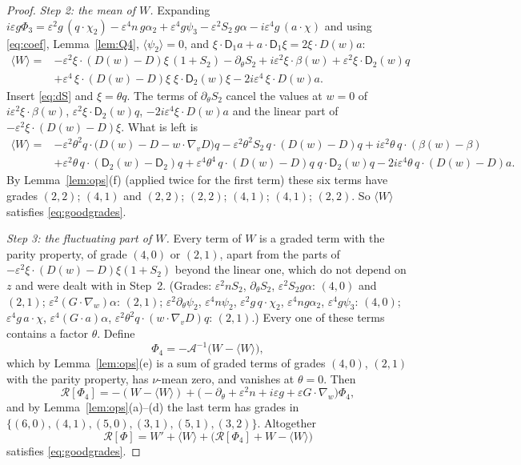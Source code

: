 \documentclass[11pt]{article}
\newcommand{\eps}{\varepsilon}
\newcommand{\cA}{\mathcal{A}}
\newcommand{\cR}{\mathcal{R}}
\newcommand{\sD}{\mathsf{D}}
\newcommand{\avg}[1]{\langle #1\rangle}
\theoremstyle{remark}
\begin{document}
\begin{proof}
\emph{Step 2: the mean of $W$.} Expanding
$i\eps g\Phi_3 = \eps^2g\,(q\cdot\chi_2) - \eps^4n\,g\alpha_2 + \eps^4g\psi_3
 - \eps^2S_2\,g\alpha - i\eps^4g\,(a\cdot\chi)$ and using \eqref{eq:coef},
Lemma~\ref{lem:Q4}, $\avg{\psi_2} = 0$, and
$\xi\cdot\sD_1a + a\cdot\sD_1\xi = 2\xi\cdot D(w)a$:
\begin{align*}
  \avg W ={}& -\eps^2\xi\cdot(D(w)-D)\xi\,(1+S_2) - \partial_\theta S_2
   + i\eps^2\xi\cdot\beta(w) + \eps^2\xi\cdot\sD_2(w)q\\
  & + \eps^4\,\xi\cdot(D(w)-D)\xi\;\xi\cdot\sD_2(w)\xi
   - 2i\eps^4\,\xi\cdot D(w)a .
\end{align*}
Insert \eqref{eq:dS} and $\xi = \theta q$. The terms of $\partial_\theta S_2$
cancel the values at $w=0$ of $i\eps^2\xi\cdot\beta(w)$,
$\eps^2\xi\cdot\sD_2(w)q$, $-2i\eps^4\xi\cdot D(w)a$ and the linear part of
$-\eps^2\xi\cdot(D(w)-D)\xi$. What is left is
\begin{align*}
  \avg W ={}& -\eps^2\theta^2q\cdot\bigl(D(w)-D-w\cdot\nabla_vD\bigr)q
   - \eps^2\theta^2S_2\,q\cdot(D(w)-D)q
   + i\eps^2\theta\,q\cdot(\beta(w)-\beta)\\
  & + \eps^2\theta\,q\cdot(\sD_2(w)-\sD_2)q
   + \eps^4\theta^4\,q\cdot(D(w)-D)q\;q\cdot\sD_2(w)q
   - 2i\eps^4\theta\,q\cdot(D(w)-D)a .
\end{align*}
By Lemma~\ref{lem:ops}(f) (applied twice for the first term) these six terms
have grades $(2,2)$; $(4,1)$ and $(2,2)$; $(2,2)$; $(4,1)$; $(4,1)$; $(2,2)$.
So $\avg W$ satisfies \eqref{eq:goodgrades}.

\emph{Step 3: the fluctuating part of $W$.} Every term of $W$ is a graded
term with the parity property, of grade $(4,0)$ or $(2,1)$, apart from the
parts of $-\eps^2\xi\cdot(D(w)-D)\xi(1+S_2)$ beyond the linear one, which do
not depend on $z$ and were dealt with in Step~2. (Grades: $\eps^2nS_2$,
$\partial_\theta S_2$, $\eps^2S_2g\alpha$: $(4,0)$ and $(2,1)$;
$\eps^2(G\cdot\nabla_w)\alpha$: $(2,1)$; $\eps^2\partial_\theta\psi_2$,
$\eps^4n\psi_2$, $\eps^2g\,q\cdot\chi_2$, $\eps^4ng\alpha_2$,
$\eps^4g\psi_3$: $(4,0)$; $\eps^4g\,a\cdot\chi$, $\eps^4(G\cdot a)\alpha$,
$\eps^2\theta^2q\cdot(w\cdot\nabla_vD)q$: $(2,1)$.) Every one of these terms
contains a factor $\theta$. Define
\[
  \Phi_4 = -\cA^{-1}\bigl(W - \avg W\bigr),
\]
which by Lemma~\ref{lem:ops}(e) is a sum of graded terms of grades $(4,0)$,
$(2,1)$ with the parity property, has $\nu$-mean zero, and vanishes at
$\theta=0$. Then
\[
  \cR[\Phi_4] = -(W-\avg W) + \bigl(-\partial_\theta + \eps^2n + i\eps g
   + \eps G\cdot\nabla_w\bigr)\Phi_4 ,
\]
and by Lemma~\ref{lem:ops}(a)--(d) the last term has grades in
$\{(6,0),(4,1),(5,0),(3,1),(5,1),(3,2)\}$. Altogether
\[
  \cR[\Phi] = W' + \avg W + \bigl(\cR[\Phi_4] + W - \avg W\bigr)
\]
satisfies \eqref{eq:goodgrades}.
\end{proof}
\end{document}
